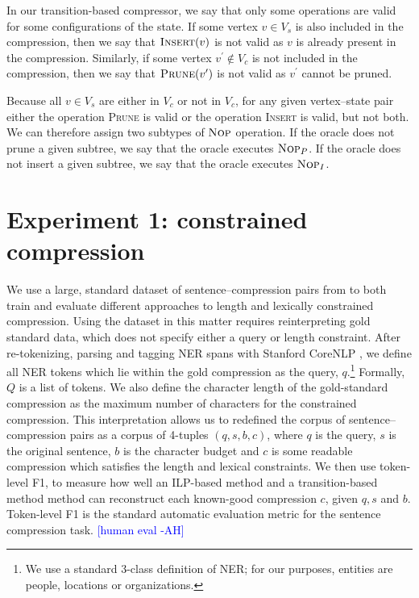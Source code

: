 \documentclass[11pt,a4paper]{article}
\newcommand{\ahcomment}[1]{\textcolor{blue}{[#1 -AH]}}
\begin{document}
In our transition-based compressor, we say that only some operations are valid for some configurations of the state. If some vertex $v \in V_s$ is also included in the compression, then we say that $\textsc{Insert}(v)$ is not valid as $v$ is already present in the compression. Similarly, if some vertex $v^{\prime} \notin V_c$ is not included in the compression, then we say that $\textsc{Prune}(v^{\prime})$ is not valid as $v^{\prime}$ cannot be pruned.

Because all $v \in V_s$ are either in $V_c$ or not in $V_c$, for any given vertex--state pair either the operation \textsc{Prune} is valid or the operation \textsc{Insert} is valid, but not both. We can therefore assign two subtypes of $\textsc{Nop}$ operation. If the oracle does not prune a given subtree, we say that the oracle executes $\textsc{Nop}_P$. If the oracle does not insert a given subtree, we say that the oracle executes $\textsc{Nop}_I$.

\section{Experiment 1: constrained compression}

We use a large, standard dataset of sentence--compression pairs from \citet{filippova2013overcoming} to both train and evaluate different approaches to length and lexically constrained compression. Using the dataset in this matter requires reinterpreting gold standard data, which does not specify either a query or length constraint. After re-tokenizing, parsing and tagging NER spans with Stanford CoreNLP \cite{corenlp}, we define all NER tokens which lie within the gold compression as the query, $q$.\footnote{We use a standard 3-class definition of NER; for our purposes, entities are people, locations or organizations.} Formally, $Q$ is a list of tokens. We also define the character length of the gold-standard compression as the maximum number of characters for the constrained compression. This interpretation allows us to redefined the corpus of sentence--compression pairs as a corpus of 4-tuples $(q,s,b,c)$, where $q$ is the query, $s$ is the original sentence, $b$ is the character budget and $c$ is some readable compression which satisfies the length and lexical constraints. We then use token-level F1, to measure how well an ILP-based method and a transition-based method method can reconstruct each known-good compression $c$, given $q,s$ and $b$. Token-level F1 is the standard automatic evaluation metric for the sentence compression task. \ahcomment{human eval}
    
\end{document}
